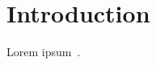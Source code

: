\chapter{Introduction}
\label{chap:intro}

Lorem ipsum~\citep{lazypropagation2010,ambiguity2010}. \lipsum[2-10]
